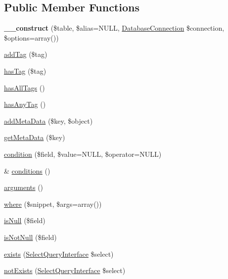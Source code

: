 \subsection*{Public Member Functions}
\begin{DoxyCompactItemize}
\item 
\hypertarget{classSelectQuery_af5d37c25a363250a7cd41f53a1365abc}{
{\bfseries \_\-\_\-construct} (\$table, \$alias=NULL, \hyperlink{classDatabaseConnection}{DatabaseConnection} \$connection, \$options=array())}
\label{classSelectQuery_af5d37c25a363250a7cd41f53a1365abc}

\item 
\hyperlink{classSelectQuery_a2efa69685cefbe98f824f5c5e97e092f}{addTag} (\$tag)
\item 
\hyperlink{classSelectQuery_a1d85219dc7e79cbff77c0b86a5861ddc}{hasTag} (\$tag)
\item 
\hyperlink{classSelectQuery_a4e1f417bc10a31d158260b6534057205}{hasAllTags} ()
\item 
\hyperlink{classSelectQuery_af5d6a2ad80e61e01d211ed769a60e312}{hasAnyTag} ()
\item 
\hyperlink{classSelectQuery_a6e453f491388dfd67e568baa8b807b01}{addMetaData} (\$key, \$object)
\item 
\hyperlink{classSelectQuery_aa153d7f1e6960d96e1c794747de1141d}{getMetaData} (\$key)
\item 
\hyperlink{classSelectQuery_a742732edee2dc50e19be1d2cdb09537b}{condition} (\$field, \$value=NULL, \$operator=NULL)
\item 
\& \hyperlink{classSelectQuery_a5cdf8e2be2dfd407bdc34bfaa2c216ad}{conditions} ()
\item 
\hyperlink{classSelectQuery_ada38099d692203d261f6a6b708a9635c}{arguments} ()
\item 
\hyperlink{classSelectQuery_a9cd4e4c627c922318203fb1193784d18}{where} (\$snippet, \$args=array())
\item 
\hyperlink{classSelectQuery_ab278e789f0e46f588f6d2c5cf030d3d8}{isNull} (\$field)
\item 
\hyperlink{classSelectQuery_a52334c418025609d024d2a21c6e487ea}{isNotNull} (\$field)
\item 
\hyperlink{classSelectQuery_a0b3d1a7b33abeef2af08601330a80844}{exists} (\hyperlink{interfaceSelectQueryInterface}{SelectQueryInterface} \$select)
\item 
\hyperlink{classSelectQuery_a800e7ee63d0d648483953bb6961738ca}{notExists} (\hyperlink{interfaceSelectQueryInterface}{SelectQueryInterface} \$select)

\end{DoxyCompactItemize}
